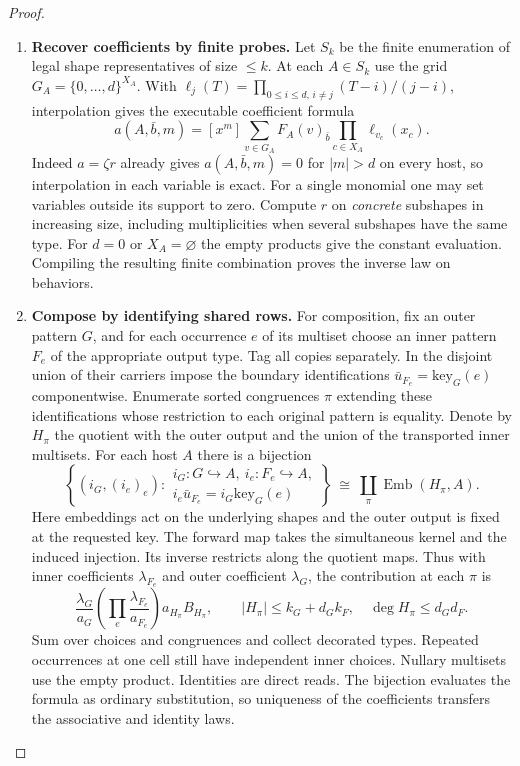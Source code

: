 \documentclass[11pt,a4paper]{article}
\theoremstyle{definition}
\theoremstyle{remark}\newaliascnt{remark}{theorem}
\numberwithin{equation}{section}
\begin{document}
\begin{proof}
\begin{enumerate}[titledsteps]
    \item \textbf{Recover coefficients by finite probes.} Let \(S_k\) be the finite enumeration of legal shape representatives of size \(\le k\). At each \(A\in S_k\) use the grid \(G_A=\{0,\ldots,d\}^{X_A}\). With \(\ell_j(T)=\prod_{0\le i\le d,\,i\ne j}(T-i)/(j-i)\), interpolation gives the executable coefficient formula
\[
 a(A,\bar b,m)=[x^m]\sum_{v\in G_A} F_A(v)_{\bar b}
                                      \prod_{c\in X_A}\ell_{v_c}(x_c).
\]
Indeed \(a=\zeta r\) already gives \(a(A,\bar b,m)=0\) for \(|m|>d\) on every host, so interpolation in each variable is exact. For a single monomial one may set variables outside its support to zero. Compute \(r\) on \emph{concrete} subshapes in increasing size, including multiplicities when several subshapes have the same type. For \(d=0\) or \(X_A=\varnothing\) the empty products give the constant evaluation. Compiling the resulting finite combination proves the inverse law on behaviors.


    \item \textbf{Compose by identifying shared rows.} For composition, fix an outer pattern \(G\), and for each occurrence \(e\) of its multiset choose an inner pattern \(F_e\) of the appropriate output type. Tag all copies separately. In the disjoint union of their carriers impose the boundary identifications \(\bar u_{F_e}=\mathrm{key}_G(e)\) componentwise. Enumerate sorted congruences \(\pi\) extending these identifications whose restriction to each original pattern is equality. Denote by \(H_\pi\) the quotient with the outer output and the union of the transported inner multisets. For each host \(A\) there is a bijection
\[
 \left\{(i_G,(i_e)_e):
 \begin{array}{l} i_G:G\hookrightarrow A,\ i_e:F_e\hookrightarrow A,\\
 i_e\bar u_{F_e}=i_G\mathrm{key}_G(e)\end{array}\right\}
 \ \cong\ \coprod_{\pi}\operatorname{Emb}(H_\pi,A).
\]
Here embeddings act on the underlying shapes and the outer output is fixed at the requested key. The forward map takes the simultaneous kernel and the induced injection. Its inverse restricts along the quotient maps. Thus with inner coefficients \(\lambda_{F_e}\) and outer coefficient \(\lambda_G\), the contribution at each \(\pi\) is
\[
 \frac{\lambda_G}{a_G}\left(\prod_e\frac{\lambda_{F_e}}{a_{F_e}}\right)
                 a_{H_\pi} B_{H_\pi},\qquad
 |H_\pi|\le k_G+d_Gk_F,\quad \deg H_\pi\le d_Gd_F .
\]
Sum over choices and congruences and collect decorated types. Repeated occurrences at one cell still have independent inner choices. Nullary multisets use the empty product. Identities are direct reads. The bijection evaluates the formula as ordinary substitution, so uniqueness of the coefficients transfers the associative and identity laws.\qedhere
\end{enumerate}
\end{proof}
\end{document}
